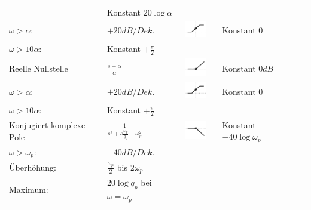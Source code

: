 \begin{landscape}
\begin{longtable}{|l|l|ll|ll|}
\begin{tabular}{ll}
			$\omega < \alpha$: & Konstant $20 \log \alpha$ \\
			$\omega > \alpha$: & $+20dB/Dek.$
		\end{tabular} & 
		\parbox[c][1cm]{1cm}{\includegraphics[width=1cm]{./images/bode-approx-phase-5.png}}	&
		\begin{tabular}{ll}
			$\omega < \frac{\alpha}{10}$: & Konstant $0$ \\
			$\omega > 10 \alpha$: & Konstant $+\frac{\pi}{2}$
		\end{tabular}
	\\ \hline	
		Reelle Nullstelle &
		$\frac{s + \alpha}{\alpha}$ &
		\parbox[c][1cm]{1cm}{\includegraphics[width=1cm]{./images/bode-approx-ampl-5.png}} &
		\begin{tabular}{ll}
			$\omega < \alpha$: & Konstant $0dB$ \\
			$\omega > \alpha$: & $+20dB/Dek.$
		\end{tabular} &
		\parbox[c][1cm]{1cm}{\includegraphics[width=1cm]{./images/bode-approx-phase-5.png}} &
		\begin{tabular}{ll}
			$\omega < \frac{\alpha}{10}$: & Konstant $0$ \\
			$\omega > 10 \alpha$: & Konstant $+\frac{\pi}{2}$
		\end{tabular}
	\\ \hline
		Konjugiert-komplexe Pole &
		$\frac{1}{s^2+s\frac{\omega_p}{q_p}+\omega_p^2}$ &
		\parbox[c][1cm]{1cm}{\includegraphics[width=1cm]{./images/bode-approx-ampl-6.png}} &
		\begin{tabular}{ll}
			$\omega < \omega_p$: 	& Konstant $-40 \log \omega_p$ \\
			$\omega > \omega_p$:	& $-40dB/Dek.$ \\
			Überhöhung: 			& $\frac{\omega_p}{2}$ bis $2\omega_p$ \\
			Maximum:				& $20 \log q_p$ bei $\omega = \omega_p$			
		\end{tabular} &

\end{longtable}
\end{landscape}
